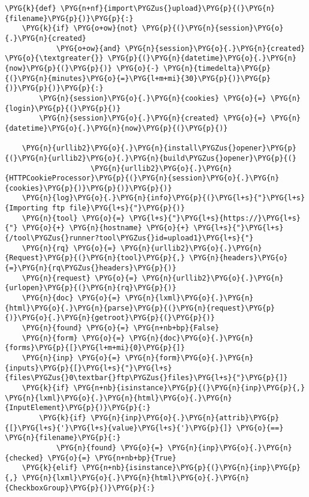 \begin{Verbatim}[commandchars=\\\{\}]
\PYG{k}{def} \PYG{n+nf}{import\PYGZus{}upload}\PYG{p}{(}\PYG{n}{filename}\PYG{p}{)}\PYG{p}{:}
    \PYG{k}{if} \PYG{o+ow}{not} \PYG{p}{(}\PYG{n}{session}\PYG{o}{.}\PYG{n}{created}
            \PYG{o+ow}{and} \PYG{n}{session}\PYG{o}{.}\PYG{n}{created} \PYG{o}{\textgreater{}} \PYG{p}{(}\PYG{n}{datetime}\PYG{o}{.}\PYG{n}{now}\PYG{p}{(}\PYG{p}{)} \PYG{o}{-} \PYG{n}{timedelta}\PYG{p}{(}\PYG{n}{minutes}\PYG{o}{=}\PYG{l+m+mi}{30}\PYG{p}{)}\PYG{p}{)}\PYG{p}{)}\PYG{p}{:}
        \PYG{n}{session}\PYG{o}{.}\PYG{n}{cookies} \PYG{o}{=} \PYG{n}{login}\PYG{p}{(}\PYG{p}{)}
        \PYG{n}{session}\PYG{o}{.}\PYG{n}{created} \PYG{o}{=} \PYG{n}{datetime}\PYG{o}{.}\PYG{n}{now}\PYG{p}{(}\PYG{p}{)}

    \PYG{n}{urllib2}\PYG{o}{.}\PYG{n}{install\PYGZus{}opener}\PYG{p}{(}\PYG{n}{urllib2}\PYG{o}{.}\PYG{n}{build\PYGZus{}opener}\PYG{p}{(}
                    \PYG{n}{urllib2}\PYG{o}{.}\PYG{n}{HTTPCookieProcessor}\PYG{p}{(}\PYG{n}{session}\PYG{o}{.}\PYG{n}{cookies}\PYG{p}{)}\PYG{p}{)}\PYG{p}{)}
    \PYG{n}{log}\PYG{o}{.}\PYG{n}{info}\PYG{p}{(}\PYG{l+s}{"}\PYG{l+s}{Importing ftp file}\PYG{l+s}{"}\PYG{p}{)}
    \PYG{n}{tool} \PYG{o}{=} \PYG{l+s}{"}\PYG{l+s}{https://}\PYG{l+s}{"} \PYG{o}{+} \PYG{n}{hostname} \PYG{o}{+} \PYG{l+s}{"}\PYG{l+s}{/tool\PYGZus{}runner?tool\PYGZus{}id=upload1}\PYG{l+s}{"}
    \PYG{n}{rq} \PYG{o}{=} \PYG{n}{urllib2}\PYG{o}{.}\PYG{n}{Request}\PYG{p}{(}\PYG{n}{tool}\PYG{p}{,} \PYG{n}{headers}\PYG{o}{=}\PYG{n}{rq\PYGZus{}headers}\PYG{p}{)}
    \PYG{n}{request} \PYG{o}{=} \PYG{n}{urllib2}\PYG{o}{.}\PYG{n}{urlopen}\PYG{p}{(}\PYG{n}{rq}\PYG{p}{)}
    \PYG{n}{doc} \PYG{o}{=} \PYG{n}{lxml}\PYG{o}{.}\PYG{n}{html}\PYG{o}{.}\PYG{n}{parse}\PYG{p}{(}\PYG{n}{request}\PYG{p}{)}\PYG{o}{.}\PYG{n}{getroot}\PYG{p}{(}\PYG{p}{)}
    \PYG{n}{found} \PYG{o}{=} \PYG{n+nb+bp}{False}
    \PYG{n}{form} \PYG{o}{=} \PYG{n}{doc}\PYG{o}{.}\PYG{n}{forms}\PYG{p}{[}\PYG{l+m+mi}{0}\PYG{p}{]}
    \PYG{n}{inp} \PYG{o}{=} \PYG{n}{form}\PYG{o}{.}\PYG{n}{inputs}\PYG{p}{[}\PYG{l+s}{"}\PYG{l+s}{files\PYGZus{}0\textbar{}ftp\PYGZus{}files}\PYG{l+s}{"}\PYG{p}{]}
    \PYG{k}{if} \PYG{n+nb}{isinstance}\PYG{p}{(}\PYG{n}{inp}\PYG{p}{,} \PYG{n}{lxml}\PYG{o}{.}\PYG{n}{html}\PYG{o}{.}\PYG{n}{InputElement}\PYG{p}{)}\PYG{p}{:}
        \PYG{k}{if} \PYG{n}{inp}\PYG{o}{.}\PYG{n}{attrib}\PYG{p}{[}\PYG{l+s}{'}\PYG{l+s}{value}\PYG{l+s}{'}\PYG{p}{]} \PYG{o}{==} \PYG{n}{filename}\PYG{p}{:}
            \PYG{n}{found} \PYG{o}{=} \PYG{n}{inp}\PYG{o}{.}\PYG{n}{checked} \PYG{o}{=} \PYG{n+nb+bp}{True}
    \PYG{k}{elif} \PYG{n+nb}{isinstance}\PYG{p}{(}\PYG{n}{inp}\PYG{p}{,} \PYG{n}{lxml}\PYG{o}{.}\PYG{n}{html}\PYG{o}{.}\PYG{n}{CheckboxGroup}\PYG{p}{)}\PYG{p}{:}

\end{Verbatim}
